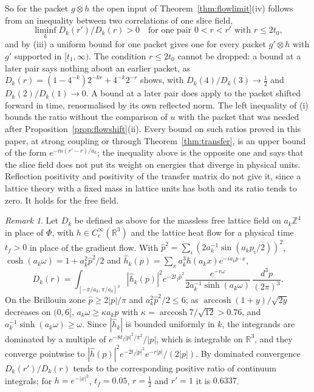 \documentclass[aps,prd,twocolumn,superscriptaddress,nofootinbib,longbibliography,floatfix,amsmath,amssymb,10pt]{revtex4-2}
\theoremstyle{definition}
\theoremstyle{remark}
\newtheorem{remark}[theorem]{Remark}
\newcommand{\R}{\mathbb{R}}
\newcommand{\Z}{\mathbb{Z}}
\begin{document}
So for the packet $g\otimes h$ the open input of
Theorem~\ref{thm:flowlimit}(iv) follows from an inequality between two
correlations of one slice field,
\[
\liminf_kD_k(r')/D_k(r)>0\quad\text{for one pair }0<r<r'\text{ with }r\le2t_0,
\]
and by (iii) a uniform bound for one packet gives one for every packet
$g'\otimes h$ with $g'$ supported in $[t_1,\infty)$. The condition $r\le2t_0$
cannot be dropped: a bound at a later pair says nothing about an earlier
packet, as $D_k(r)=(1-4^{-k})2^{-kr}+4^{-k}2^{-r}$ shows, with
$D_k(4)/D_k(3)\to\frac12$ and $D_k(2)/D_k(1)\to0$. A bound at a later pair
does apply to the packet shifted forward in time, renormalised by its own
reflected norm. The left inequality of
(i) bounds the ratio without the comparison of $u$ with the packet that was
needed after Proposition~\ref{prop:flowshift}(ii). Every bound on such ratios
proved in this paper, at strong coupling or through
Theorem~\ref{thm:transfer}, is an upper bound of the form
$e^{-m(r'-r)/a_k}$; the inequality above is the opposite one and says
that the slice field does not put its weight on energies that diverge in
physical units. Reflection positivity and positivity of the transfer matrix
do not give it, since a lattice theory with a fixed mass in lattice units has
both and its ratio tends to zero. It holds for the free field.

\begin{remark}\label{rem:freeslice}
Let $D_k$ be defined as above for the massless free lattice field on
$a_k\Z^4$ in place of $\Phi$, with $h\in C^\infty_c(\R^3)$ and the lattice heat
flow for a physical time $t_f>0$ in place of the gradient flow. With $\hat p^2=\sum_i(2a_k^{-1}\sin
(a_kp_i/2))^2$, $\cosh(a_k\omega)=1+a_k^2\hat p^2/2$ and
$\hat h_k(p)=\sum_xa_k^3h(a_kx)e^{-ia_kp\cdot x}$,
\[
D_k(r)=\int_{[-\pi/a_k,\pi/a_k]^3}|\hat h_k(p)|^2e^{-2t_f\hat p^2}
\frac{e^{-r\omega}}{2a_k^{-1}\sinh(a_k\omega)}\,\frac{d^3p}{(2\pi)^3} .
\]
On the Brillouin zone $\hat p\ge2|p|/\pi$ and $a_k^2\hat p^2/2\le6$; as
$\operatorname{arccosh}(1+y)/\sqrt{2y}$ decreases on $(0,6]$, $a_k\omega\ge
\kappa a_k\hat p$ with $\kappa=\operatorname{arccosh}7/\sqrt{12}>0.76$, and
$a_k^{-1}\sinh(a_k\omega)\ge\omega$. Since $|\hat h_k|$ is bounded
uniformly in $k$, the integrands are dominated by a multiple of
$e^{-8t_f|p|^2/\pi^2}/|p|$, which is integrable on $\R^3$, and they
converge pointwise to $|\hat h(p)|^2e^{-2t_f|p|^2}e^{-r|p|}/
(2|p|)$. By dominated convergence $D_k(r')/D_k(r)$ tends to the
corresponding positive ratio of continuum integrals; for $h=e^{-|x|^2}$,
$t_f=0.05$, $r=\frac12$ and $r'=1$ it is $0.6337$.
\end{remark}
\end{document}
